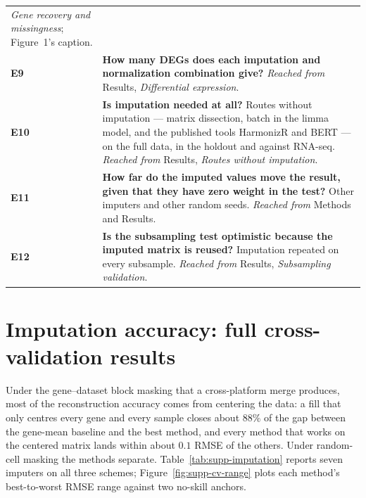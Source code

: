 \documentclass[11pt,a4paper]{article}
\begin{document}
\begin{tabularx}{\textwidth}{@{}lX@{}}
  \emph{Gene recovery and missingness}; Figure~1's caption. \\
\addlinespace
\textbf{E9} & \textbf{How many DEGs does each imputation and normalization
  combination give?} \emph{Reached from} Results,
  \emph{Differential expression}. \\
\addlinespace
\textbf{E10} & \textbf{Is imputation needed at all?} Routes without
  imputation --- matrix dissection, batch in the limma model, and the
  published tools HarmonizR and BERT --- on the full data, in the
  holdout and against RNA-seq. \emph{Reached from} Results,
  \emph{Routes without imputation}. \\
\addlinespace
\textbf{E11} & \textbf{How far do the imputed values move the result, given
  that they have zero weight in the test?} Other imputers and other
  random seeds. \emph{Reached from} Methods and Results. \\
\addlinespace
\textbf{E12} & \textbf{Is the subsampling test optimistic because the imputed
  matrix is reused?} Imputation repeated on every subsample.
  \emph{Reached from} Results, \emph{Subsampling validation}. \\
\bottomrule
\end{tabularx}

\bigskip

\section{Imputation accuracy: full cross-validation results}
\label{sec:supp-imputation}

Under the gene--dataset block masking that a cross-platform merge
produces, most of the reconstruction accuracy comes from centering
the data: a fill that only centres every gene and every sample
closes about $88\%$ of the gap between the gene-mean baseline and
the best method, and every method that works on the centered
matrix lands within about $0.1$ RMSE of the others. Under
random-cell masking the methods separate.
Table~\ref{tab:supp-imputation} reports seven imputers on all
three schemes; Figure~\ref{fig:supp-cv-range} plots each method's
best-to-worst RMSE range against two no-skill anchors.
\end{document}
